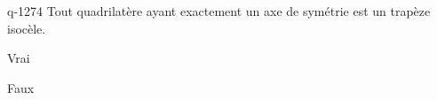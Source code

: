 \begin{truefalse}{q-1274}
Tout quadrilatère ayant exactement un axe de symétrie est un trapèze isocèle.
\item Vrai
\item* Faux
\end{truefalse}

